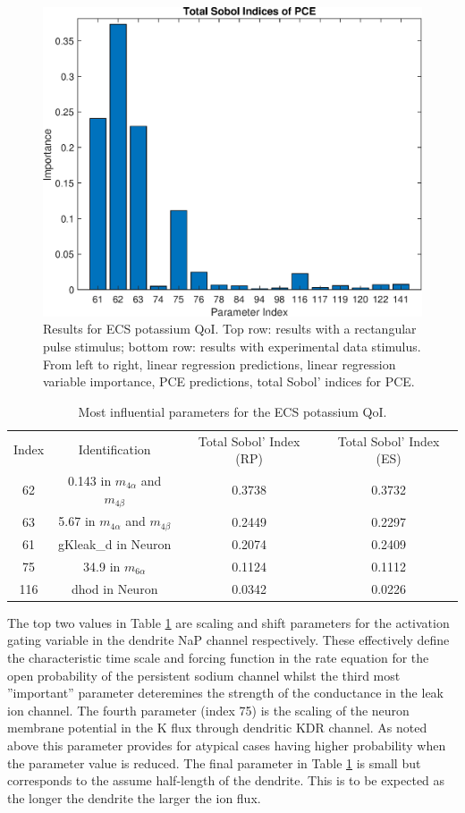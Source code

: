 \begin{figure}[h]
\includegraphics[width=.24 \textwidth]{Figures/K_ECS_Mean_QoI_PCE_SI_Experimental.eps}
\caption{Results for ECS potassium QoI. Top row: results with a rectangular pulse stimulus; bottom row: results with experimental data stimulus. From left to right, linear regression predictions, linear regression variable importance, PCE predictions, total Sobol' indices for PCE.}
\label{fig:K_ECS_Mean}
\end{figure}

\begin{table}[h]
\centering
\begin{tabular}{cccc}
Index & Identification & Total Sobol' Index (RP) & Total Sobol' Index (ES)\\
62 & 0.143 in $m_{4\alpha}$ and $m_{4 \beta}$ &  0.3738 & 0.3732\\
63 & 5.67 in $m_{4\alpha}$ and $m_{4 \beta}$  &  0.2449 & 0.2297\\
61 & gKleak\_d in Neuron &0.2074 & 0.2409\\
75 & 34.9 in $m_{6 \alpha}$ & 0.1124 & 0.1112\\
116 & dhod in Neuron & 0.0342 & 0.0226\\
\end{tabular}
\caption{Most influential parameters for the ECS potassium QoI.}
\label{tab:K_ECS_Mean}
\end{table}

The top two values in Table \ref{tab:K_ECS_Mean} are scaling and shift parameters for the activation gating variable in the dendrite NaP channel respectively. These effectively define the characteristic time scale and forcing function in the rate equation for the open  probability of the persistent sodium channel whilst the third most ''important'' parameter deteremines the strength of the  conductance in the \pot leak ion channel. The fourth parameter (index 75) is the scaling of the neuron membrane potential in the K flux through dendritic KDR channel. As noted above this parameter provides for atypical cases having higher probability when the parameter value is reduced. The final parameter in Table \ref{tab:K_ECS_Mean} is small but corresponds to the assume half-length of the dendrite. This is to be expected as the longer the dendrite the larger the ion flux. 

